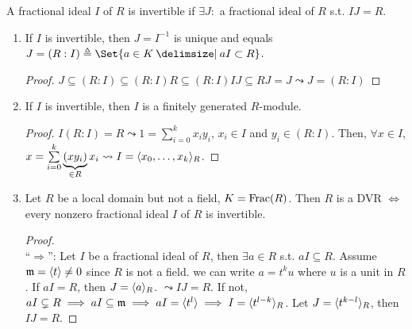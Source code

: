 \begin{definition}
  A fractional ideal $I$ of $R$ is invertible if $\exists J:$ a fractional ideal
  of $R$ s.t. $IJ = R$.
\end{definition}

\begin{prop}\mbox{}
  \begin{enumerate}
    \item If $I$ is invertible, then $J = I^{-1}$ is unique and equals
      $J = (R:I) \triangleq \Set{a \in K \given aI \subset R}$.
      \begin{proof}
        $ J \subseteq (R:I) \subseteq (R:I)R \subseteq (R:I)IJ \subseteq RJ = J
        \leadsto J = (R:I) $
      \end{proof}
    \item If $I$ is invertible, then $I$ is a finitely generated $R$-module.
      \begin{proof}
        $I(R:I) = R \leadsto 1 = \sum\limits_{i = 0}^{k} x_iy_i$, $x_i \in I$ and
        $y_i \in (R:I)$. Then, $\forall x \in I$, $x = \sum\limits_{i = 0}^{k} 
        \underbrace{(xy_i)}_{\in R}x_i \leadsto I = \langle x_0, \dots, x_k\rangle_R$.
      \end{proof}
    \item Let $R$ be a local domain but not a field, $K = \operatorname{Frac}(R)$.
      Then $R$ is a DVR $\iff$ every nonzero fractional ideal $I$ of $R$ is
      invertible.
      \begin{proof} \mbox{} \\
        ``$\Rightarrow$'':
        Let $I$ be a fractional ideal of $R$, then $\exists a \in R$ s.t.
        $aI \subseteq R$. Assume $\mathfrak{m} = \langle t\rangle \ne 0$ since $R$ is not a field.
        we can write $a = t^k u$ where $u$ is a unit in $R$.
        If $aI = R$, then $J = \langle a\rangle_R$. $\leadsto IJ = R$. If not,
        $aI \subsetneq R \implies aI \subseteq \mathfrak{m} \implies aI = \langle t^l\rangle
        \implies I = \langle t^{l - k}\rangle_R$. Let $J = \langle t^{k - l}\rangle_R$, then $IJ
         = R$.


\end{proof}
\end{enumerate}
\end{prop}
